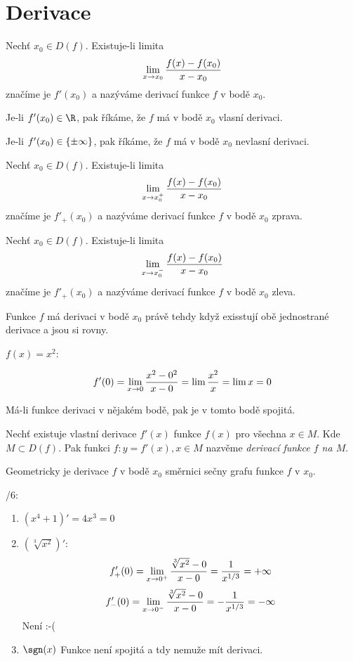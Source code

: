 
\BeginDoc{}
\def\posloup{$\zs{a_n}_{n=1}^{\infty}$}
\def\pos#1{\zs{#1}_{n=1}^{\infty}}
\def\li{\lim_{n\rightarrow\infty}}
\def\lix{\lim_{x\rightarrow x_0}}
\def\r{\rightarrow}
\def\sup{{\rm sup\ }}
\def\sciwinfup{{\rm inf\ }}
\def\su{\sum_{n=1}^{\infty}}
\section{Derivace}

\Def
Nechť $x_0 \in D(f)$. Existuje-li limita
$$ \lim_{x\r x_0} \f{f(x)-f(x_0)}{x-x_0} $$
značíme je $f'(x_0)$ a nazýváme derivací funkce $f$ v bodě $x_0$.

Je-li $f'(x_0)\in\R$, pak říkáme, že $f$ má v bodě $x_0$ vlasní derivaci.

Je-li $f'(x_0)\in\left\{{\pm\infty}\right\}$, pak říkáme, že $f$ má v bodě $x_0$ nevlasní derivaci.

\Def
Nechť $x_0 \in D(f)$. Existuje-li limita
$$ \lim_{x\r x_0^+} \f{f(x)-f(x_0)}{x-x_0} $$
značíme je $f'_+(x_0)$ a nazýváme derivací funkce $f$ v bodě $x_0$ zprava.

Nechť $x_0 \in D(f)$. Existuje-li limita
$$ \lim_{x\r x_0^-} \f{f(x)-f(x_0)}{x-x_0} $$
značíme je $f'_+(x_0)$ a nazýváme derivací funkce $f$ v bodě $x_0$ zleva.

\V  Funkce $f$ má derivaci v bodě $x_0$ právě tehdy když exisstují obě jednostrané derivace a jsou si rovny.


\Pr

$f(x)=x^2$:

$$f'(0) = \lim_{x\r 0} \f{x^2-0^2}{x-0} = \lim \f{x^2}{x} = \lim x = 0$$


 Má-li funkce derivaci v nějakém bodě, pak je  v tomto bodě spojitá.

\Def Nechť existuje vlastní derivace $f'(x)$  funkce $f(x)$ pro všechna $x\in M$.
Kde $M\subset D(f)$. Pak funkci $f:y=f'(x),x\in M$ nazvěme \emph{derivací funkce $f$ na $M$}.

\Poz Geometricky je derivace $f$ v bodě $x_0$ směrnici sečny grafu funkce $f$ v $x_0$.


/6:
\begin{enumerate}
\item $(x^4+1)' = 4x^3 = 0$
\item $(\sqrt[3]{x^2})'$:
$$f'_+(0) = \lim_{x\r 0^+} \f{\sqrt[3]{x^2} - 0}{x-0} = \f 1 {x^{1/3}} = +\infty $$
$$f'_-(0) = \lim_{x\r 0^-} \f{\sqrt[3]{x^2} - 0}{x-0} = - \f 1 {x^{1/3}} = -\infty $$
Není :-(
\item $\sgn(x)$
Funkce není spojitá a tdy nemuže mít derivaci.
\end{enumerate}



